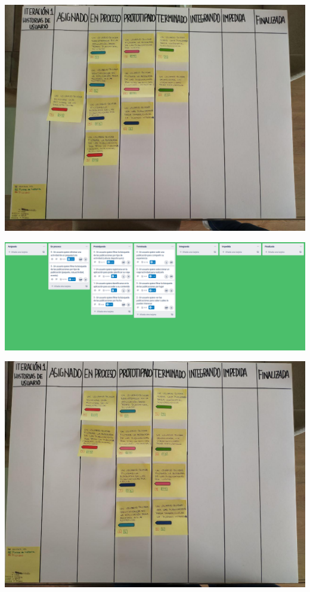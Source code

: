 \documentclass[spanish]{beamer}
\begin{document}
\begin{frame}
	\begin{center}
		\includegraphics[scale=0.34]{papel1_7}
	\end{center}
\end{frame}

\begin{frame}
	\begin{center}
		\includegraphics[scale=0.25]{trello1_8}
	\end{center}
\end{frame}

\begin{frame}
	\begin{center}
		\includegraphics[angle=90, scale=0.34]{papel1_8}
	\end{center}
\end{frame}
\end{document}
